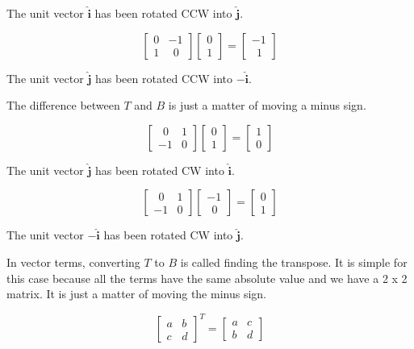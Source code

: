 \documentclass[11pt, oneside]{article}
\begin{document}
The unit vector $\mathbf{\hat{i}}$ has been rotated CCW into $\mathbf{\hat{j}}$.

\[
\begin{bmatrix}  
0 & -1 \\
1 & \ \ 0
\end{bmatrix}
\begin{bmatrix}
0 \\
1
\end{bmatrix}
=
\begin{bmatrix}  
-1 \\
\ \ 1
\end{bmatrix}
\]

The unit vector $\mathbf{\hat{j}}$ has been rotated CCW into $-\mathbf{\hat{i}}$.

The difference between $T$ and $B$ is just a matter of moving a minus sign.  

\[
\begin{bmatrix}  
\ \ 0 & 1 \\
- 1 & 0
\end{bmatrix}
\begin{bmatrix}
0 \\
1
\end{bmatrix}
=
\begin{bmatrix}  
1 \\
0
\end{bmatrix}
\]

The unit vector $\mathbf{\hat{j}}$ has been rotated CW into $\mathbf{\hat{i}}$.

\[
\begin{bmatrix}  
\ \ 0 &1 \\
-1 & 0
\end{bmatrix}
\begin{bmatrix}
-1 \\
\ \ 0
\end{bmatrix}
=
\begin{bmatrix}  
0 \\
1
\end{bmatrix}
\]

The unit vector $-\mathbf{\hat{i}}$ has been rotated CW into $\mathbf{\hat{j}}$.

In vector terms, converting $T$ to $B$ is called finding the transpose.  It is simple for this case because all the terms have the same absolute value and we have a 2 x 2 matrix.  It is just a matter of moving the minus sign.

\[
\begin{bmatrix}  
a & b \\
c & d
\end{bmatrix}^T
=
\begin{bmatrix}  
a & c \\
b & d
\end{bmatrix}
\]
\end{document}
